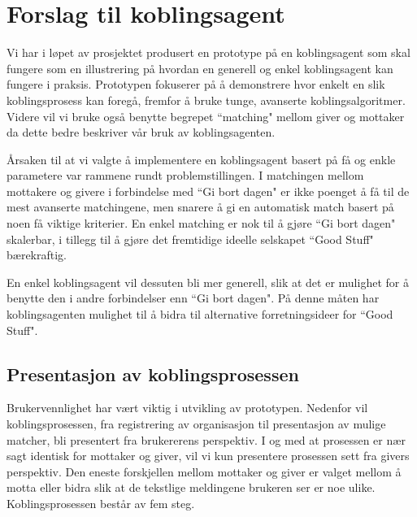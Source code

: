 \chapter{Forslag til koblingsagent}
Vi har i løpet av prosjektet produsert en prototype på en koblingsagent som skal fungere som en illustrering på hvordan en generell og enkel koblingsagent kan fungere i praksis. Prototypen fokuserer på å demonstrere hvor enkelt en slik koblingsprosess kan foregå, fremfor å bruke tunge, avanserte koblingsalgoritmer. Videre vil vi bruke også benytte begrepet ``matching" mellom giver og mottaker da dette bedre beskriver vår bruk av koblingsagenten.

Årsaken til at vi valgte å implementere en koblingsagent basert på få og enkle parametere var rammene rundt problemstillingen. I matchingen mellom mottakere og givere i forbindelse med ``Gi bort dagen" er ikke poenget å få til de mest avanserte matchingene, men snarere å gi en automatisk match basert på noen få viktige kriterier. En enkel matching er nok til å gjøre ``Gi bort dagen" skalerbar, i tillegg til å gjøre det fremtidige ideelle selskapet ``Good Stuff" bærekraftig.

En enkel koblingsagent vil dessuten bli mer generell, slik at det er mulighet for å benytte den i andre forbindelser enn ``Gi bort dagen". På denne måten har koblingsagenten mulighet til å bidra til alternative forretningsideer for ``Good Stuff".

\section{Presentasjon av koblingsprosessen}

Brukervennlighet har vært viktig i utvikling av prototypen. Nedenfor vil koblingsprosessen, fra registrering av organisasjon til presentasjon av mulige matcher, bli presentert fra brukererens perspektiv. I og med at prosessen er nær sagt identisk for mottaker og giver, vil vi kun presentere prosessen sett fra givers perspektiv. Den eneste forskjellen mellom mottaker og giver er valget mellom å motta eller bidra slik at de tekstlige meldingene brukeren ser er noe ulike.\\

Koblingsprosessen består av fem steg.\\

